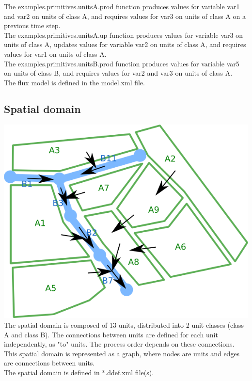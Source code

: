 \documentclass[a4paper,11pt]{article}
\begin{document}
\bigskip
\bigskip

The examples.primitives.unitsA.prod function produces values for 
variable var1 and var2 on units of class A, and requires values for var3 on units of class A 
on a previous time step.\\
The examples.primitives.unitsA.up function produces values for variable var3 on units of class A, 
updates values for variable var2 on units of class A, and requires values for var1 on units of class A.\\
The examples.primitives.unitsB.prod function produces values for variable var5 on units of class B,
and requires values for var2 and var3 on units of class A.\\
The flux model is defined in the model.xml file.

\bigskip
\bigskip

\subsection{Spatial domain}

\includegraphics[scale=0.5]{openfluid-engine_example-primitives_en/domain.png}
The spatial domain is composed of 13 units, distributed into 2 unit classes 
(class A and class B). The connections between 
units are defined for each unit independently, as "to" units. The process order 
depends on these connections. This spatial domain is represented as a graph, 
where nodes are units and edges are connections between units.\\
\noindent The spatial domain is defined in *.ddef.xml file(s). 
\end{document}
